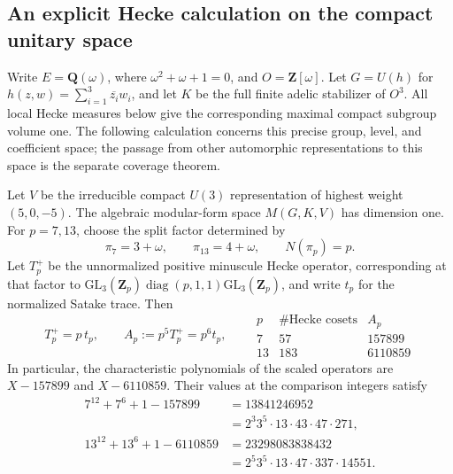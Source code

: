 \subsection{An explicit Hecke calculation on the compact unitary space}
\label{sec:u3-hecke}

Write $E=\mathbf Q(\omega)$, where $\omega^2+\omega+1=0$, and
$O=\mathbf Z[\omega]$.  Let $G=U(h)$ for
$h(z,w)=\sum_{i=1}^3\overline{z_i}w_i$, and let $K$ be the full
finite adelic stabilizer of $O^3$.  All local Hecke measures below give
the corresponding maximal compact subgroup volume one.  The following
calculation concerns this precise group, level, and coefficient space;
the passage from other automorphic representations to this space is the
separate coverage theorem.

\begin{theorem}[K17-U3-HECKE]\label{thm:u3-hecke}
Let $V$ be the irreducible compact $U(3)$ representation of highest
weight $(5,0,-5)$.  The algebraic modular-form space $M(G,K,V)$ has
dimension one.  For $p=7,13$, choose the split factor determined by
\[
 \pi_7=3+\omega,\qquad \pi_{13}=4+\omega,
 \qquad N(\pi_p)=p.
\]
Let $T_p^+$ be the unnormalized positive minuscule Hecke operator,
corresponding at that factor to
$\mathrm{GL}_3(\mathbf Z_p)\operatorname{diag}(p,1,1)
 \mathrm{GL}_3(\mathbf Z_p)$, and write $t_p$ for the normalized
Satake trace.  Then
\[
 T_p^+=p\,t_p,\qquad A_p:=p^5T_p^+=p^6t_p,
 \qquad
 \begin{array}{c|r|r}
 p&\#\text{Hecke cosets}&A_p\\ \hline
 7&57&157899\\
 13&183&6110859
 \end{array}
 \tag{UH.1}
\]
In particular, the characteristic polynomials of the scaled operators
are $X-157899$ and $X-6110859$.  Their values at the comparison
integers satisfy
\begin{align*}
 7^{12}+7^6+1-157899
   &=13841246952\\
   &=2^3 3^5\cdot13\cdot43\cdot47\cdot271,\\
 13^{12}+13^6+1-6110859
   &=23298083838432\\
   &=2^5 3^5\cdot13\cdot47\cdot337\cdot14551.
\end{align*}
\end{theorem}

